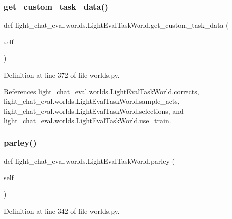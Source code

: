 \subsubsection{\texorpdfstring{get\+\_\+custom\+\_\+task\+\_\+data()}{get\_custom\_task\_data()}}
{\footnotesize\ttfamily def light\+\_\+chat\+\_\+eval.\+worlds.\+Light\+Eval\+Task\+World.\+get\+\_\+custom\+\_\+task\+\_\+data (\begin{DoxyParamCaption}\item[{}]{self }\end{DoxyParamCaption})}



Definition at line 372 of file worlds.\+py.



References light\+\_\+chat\+\_\+eval.\+worlds.\+Light\+Eval\+Task\+World.\+corrects, light\+\_\+chat\+\_\+eval.\+worlds.\+Light\+Eval\+Task\+World.\+sample\+\_\+acts, light\+\_\+chat\+\_\+eval.\+worlds.\+Light\+Eval\+Task\+World.\+selections, and light\+\_\+chat\+\_\+eval.\+worlds.\+Light\+Eval\+Task\+World.\+use\+\_\+train.

\mbox{\label{classlight__chat__eval_1_1worlds_1_1LightEvalTaskWorld_ae0eca37fa3376ebcd24115d1246dfd81}} 
\subsubsection{\texorpdfstring{parley()}{parley()}}
{\footnotesize\ttfamily def light\+\_\+chat\+\_\+eval.\+worlds.\+Light\+Eval\+Task\+World.\+parley (\begin{DoxyParamCaption}\item[{}]{self }\end{DoxyParamCaption})}



Definition at line 342 of file worlds.\+py.



